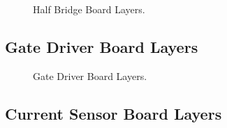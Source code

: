 \begin{figure}[H]
\begin{subfigmatrix}{4}
	\end{subfigmatrix}
	\caption{Half Bridge Board Layers.}
	\label{fig:half_bridge_board_layers}
\end{figure}

\def\excerpt{\subsection{Gate Driver Board Schematic}\label{section:gate_driver_files}}


\subsection{Gate Driver Board Layers}
\begin{figure}[H]
	\centering
	\begin{subfigmatrix}{2}
		\hfill{ }
		\hfill{ }
	\end{subfigmatrix}
	\begin{subfigmatrix}{2}
		\hfill{ }
		\hfill{ }
	\end{subfigmatrix}
	\caption{Gate Driver Board Layers.}
	\label{fig:gate_driver_board_layers}
\end{figure}

\def\excerpt{\subsection{Current Sensor Board Schematic}\label{section:current_sensor_files}}



\subsection{Current Sensor Board Layers}
